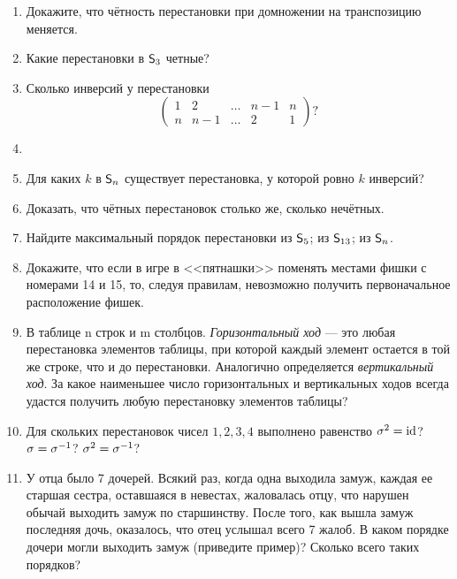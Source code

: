 \begin{enumerate}

\item Докажите, что чётность перестановки при домножении на
транспозицию меняется.

\item Какие перестановки в ${\mathsf{S}}_3$ четные?

\item Сколько инверсий у перестановки
$$
\begin{pmatrix}
1 & 2 & \dots & n-1 & n \\
n & n-1 & \dots & 2 & 1
\end{pmatrix}?
$$


\item 


\item Для каких $k$ в ${\mathsf{S}}_n$ существует перестановка, у которой ровно $k$ инверсий?

\item Доказать, что чётных перестановок столько же, сколько нечётных.

\item  Найдите максимальный порядок перестановки \ipunkt из ${\mathsf{S}}_5$; \ipunkt из
${\mathsf{S}}_{13}$; \ipunkt из ${\mathsf{S}}_n$.

\item Докажите, что если в игре в <<пятнашки>> поменять местами
фишки с номерами 14 и 15, то, следуя правилам, невозможно получить первоначальное расположение фишек.

\item  В таблице n строк и m столбцов. \textit{Горизонтальный ход} --- это
любая перестановка элементов таблицы, при которой каждый элемент остается
 в той же строке, что и до перестановки. Аналогично
определяется \textit{вертикальный ход}. За какое наименьшее число горизонтальных
 и вертикальных ходов всегда удастся получить любую перестановку элементов таблицы?

\item Для скольких перестановок чисел $1, 2, 3, 4$ выполнено равенство
\ipunkt $\sigma^2 = \mathrm{id}$? \ipunkt $\sigma = \sigma^{-1}$? \ipunkt $\sigma^2 = \sigma^{-1}$?

\item  У отца было 7 дочерей. Всякий раз, когда одна выходила замуж,
 каждая ее старшая сестра, оставшаяся в невестах, жаловалась
отцу, что нарушен обычай выходить замуж по старшинству. После
того, как вышла замуж последняя дочь, оказалось, что отец услышал всего 7 жалоб.
 В каком порядке дочери могли выходить замуж
(приведите пример)? Сколько всего таких порядков?


\end{enumerate}
